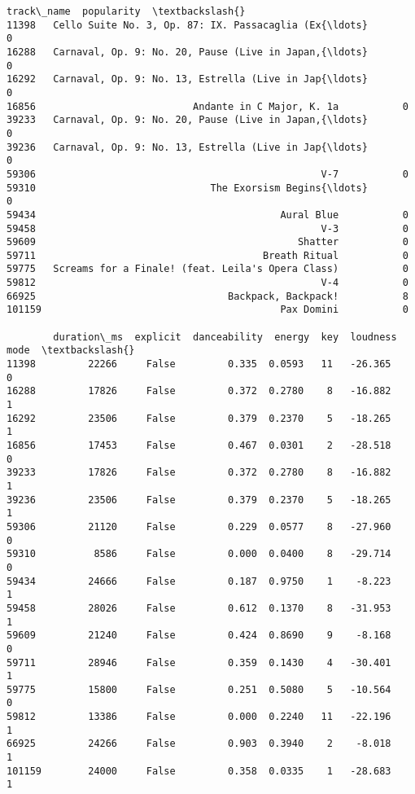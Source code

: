 \documentclass[11pt]{article}
\begin{document}
\begin{tcolorbox}[breakable, size=fbox, boxrule=.5pt, pad at break*=1mm, opacityfill=0]
\begin{Verbatim}[commandchars=\\\{\}]
                                               track\_name  popularity  \textbackslash{}
11398   Cello Suite No. 3, Op. 87: IX. Passacaglia (Ex{\ldots}           0
16288   Carnaval, Op. 9: No. 20, Pause (Live in Japan,{\ldots}           0
16292   Carnaval, Op. 9: No. 13, Estrella (Live in Jap{\ldots}           0
16856                           Andante in C Major, K. 1a           0
39233   Carnaval, Op. 9: No. 20, Pause (Live in Japan,{\ldots}           0
39236   Carnaval, Op. 9: No. 13, Estrella (Live in Jap{\ldots}           0
59306                                                 V-7           0
59310                              The Exorsism Begins{\ldots}           0
59434                                          Aural Blue           0
59458                                                 V-3           0
59609                                             Shatter           0
59711                                       Breath Ritual           0
59775   Screams for a Finale! (feat. Leila's Opera Class)           0
59812                                                 V-4           0
66925                                 Backpack, Backpack!           8
101159                                         Pax Domini           0

        duration\_ms  explicit  danceability  energy  key  loudness  mode  \textbackslash{}
11398         22266     False         0.335  0.0593   11   -26.365     0
16288         17826     False         0.372  0.2780    8   -16.882     1
16292         23506     False         0.379  0.2370    5   -18.265     1
16856         17453     False         0.467  0.0301    2   -28.518     0
39233         17826     False         0.372  0.2780    8   -16.882     1
39236         23506     False         0.379  0.2370    5   -18.265     1
59306         21120     False         0.229  0.0577    8   -27.960     0
59310          8586     False         0.000  0.0400    8   -29.714     0
59434         24666     False         0.187  0.9750    1    -8.223     1
59458         28026     False         0.612  0.1370    8   -31.953     1
59609         21240     False         0.424  0.8690    9    -8.168     0
59711         28946     False         0.359  0.1430    4   -30.401     1
59775         15800     False         0.251  0.5080    5   -10.564     0
59812         13386     False         0.000  0.2240   11   -22.196     1
66925         24266     False         0.903  0.3940    2    -8.018     1
101159        24000     False         0.358  0.0335    1   -28.683     1


\end{Verbatim}
\end{tcolorbox}
\end{document}
